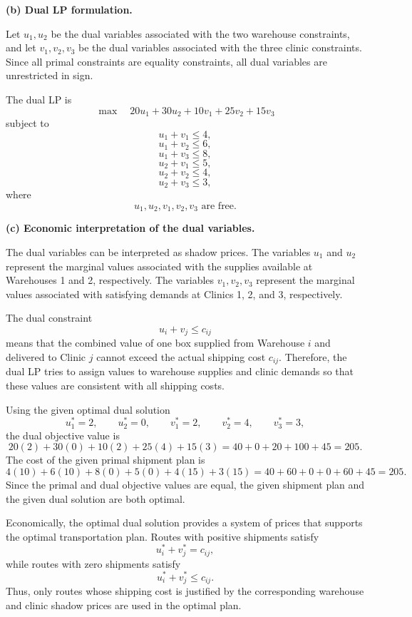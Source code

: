 \documentclass[11pt]{article}
\begin{document}
\begin{enumerate}
{\textbf{(b) Dual LP formulation.}

Let $u_1,u_2$ be the dual variables associated with the two warehouse constraints, and let $v_1,v_2,v_3$ be the dual variables associated with the three clinic constraints. Since all primal constraints are equality constraints, all dual variables are unrestricted in sign.

The dual LP is
\[
\max \quad 20u_1+30u_2+10v_1+25v_2+15v_3
\]
subject to
\[
u_1+v_1\leq 4,
\]
\[
u_1+v_2\leq 6,
\]
\[
u_1+v_3\leq 8,
\]
\[
u_2+v_1\leq 5,
\]
\[
u_2+v_2\leq 4,
\]
\[
u_2+v_3\leq 3,
\]
where
\[
u_1,u_2,v_1,v_2,v_3 \text{ are free.}
\]

\textbf{(c) Economic interpretation of the dual variables.}

The dual variables can be interpreted as shadow prices. The variables $u_1$ and $u_2$ represent the marginal values associated with the supplies available at Warehouses 1 and 2, respectively. The variables $v_1,v_2,v_3$ represent the marginal values associated with satisfying demands at Clinics 1, 2, and 3, respectively.

The dual constraint
\[
u_i+v_j\leq c_{ij}
\]
means that the combined value of one box supplied from Warehouse $i$ and delivered to Clinic $j$ cannot exceed the actual shipping cost $c_{ij}$. Therefore, the dual LP tries to assign values to warehouse supplies and clinic demands so that these values are consistent with all shipping costs.

Using the given optimal dual solution
\[
u_1^*=2,\qquad u_2^*=0,\qquad v_1^*=2,\qquad v_2^*=4,\qquad v_3^*=3,
\]
the dual objective value is
\[
20(2)+30(0)+10(2)+25(4)+15(3)
=
40+0+20+100+45
=
205.
\]
The cost of the given primal shipment plan is
\[
4(10)+6(10)+8(0)+5(0)+4(15)+3(15)
=
40+60+0+0+60+45
=
205.
\]
Since the primal and dual objective values are equal, the given shipment plan and the given dual solution are both optimal.

Economically, the optimal dual solution provides a system of prices that supports the optimal transportation plan. Routes with positive shipments satisfy
\[
u_i^*+v_j^*=c_{ij},
\]
while routes with zero shipments satisfy
\[
u_i^*+v_j^*\leq c_{ij}.
\]
Thus, only routes whose shipping cost is justified by the corresponding warehouse and clinic shadow prices are used in the optimal plan.
}

\vspace{1em}



\end{enumerate}
\end{document}
